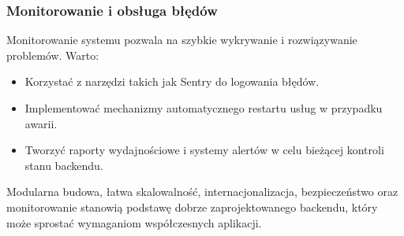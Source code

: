 \subsubsection{Monitorowanie i obsługa błędów}
Monitorowanie systemu pozwala na szybkie wykrywanie i rozwiązywanie problemów. Warto:
\begin{itemize}
	\item Korzystać z narzędzi takich jak Sentry do logowania błędów.
	\item Implementować mechanizmy automatycznego restartu usług w przypadku awarii.
	\item Tworzyć raporty wydajnościowe i systemy alertów w celu bieżącej kontroli stanu backendu.
\end{itemize}

Modularna budowa, łatwa skalowalność, internacjonalizacja, bezpieczeństwo oraz monitorowanie stanowią podstawę dobrze zaprojektowanego backendu, który może sprostać wymaganiom współczesnych aplikacji.
